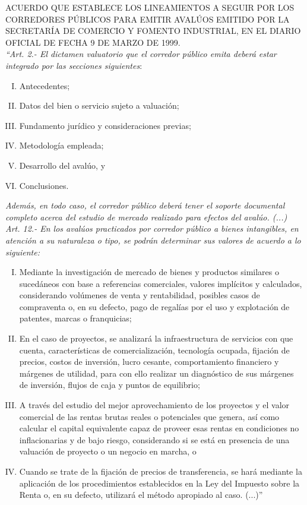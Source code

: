 
\textcolor{principal}{ACUERDO QUE ESTABLECE LOS LINEAMIENTOS A SEGUIR POR LOS CORREDORES P\'UBLICOS PARA EMITIR AVAL\'UOS EMITIDO POR LA SECRETAR\'IA DE COMERCIO Y FOMENTO INDUSTRIAL, EN EL DIARIO OFICIAL DE FECHA 9 DE MARZO DE 1999.}\\[10pt]

\textit{``Art. 2.- El dictamen valuatorio que el corredor p\'ublico emita deber\'a estar integrado por las secciones siguientes}:

\begin{enumerate}[I.]
\item Antecedentes;
\item Datos del bien o servicio sujeto a valuaci\'on;
\item Fundamento jur\'idico y consideraciones previas;
\item Metodolog\'ia empleada;
\item Desarrollo del aval\'uo, y
\item Conclusiones.
\end{enumerate}


\textit{Adem\'as, en todo caso, el corredor p\'ublico deber\'a tener el soporte documental completo acerca del estudio de mercado realizado para efectos del aval\'uo. (...)}\\[10pt]

\textit{Art. 12.- En los aval\'uos practicados por corredor p\'ublico a bienes intangibles, en atenci\'on a su naturaleza o tipo, se podr\'an determinar sus valores de acuerdo a lo siguiente:}

\begin{enumerate}[I.-]
\item Mediante la investigaci\'on de mercado de bienes y productos similares o suced\'aneos con base a referencias comerciales, valores impl\'icitos y calculados, considerando vol\'umenes de venta y rentabilidad, posibles casos de compraventa o, en su defecto, pago de regal\'ias por el uso y explotaci\'on de patentes, marcas o franquicias;


\item En el caso de proyectos, se analizar\'a la infraestructura de servicios con que cuenta, caracter\'isticas de comercializaci\'on, tecnolog\'ia ocupada, fijaci\'on de precios, costos de inversi\'on, lucro cesante, comportamiento financiero y m\'argenes de utilidad, para con ello realizar un diagn\'ostico de sus m\'argenes de inversi\'on, flujos de caja y puntos de equilibrio;

\item A trav\'es del estudio del mejor aprovechamiento de los proyectos y el valor comercial de las rentas brutas reales o potenciales que genera, as\'i como calcular el capital equivalente capaz de proveer esas rentas en condiciones no inflacionarias y de bajo riesgo, considerando si se est\'a en presencia de una valuaci\'on de proyecto o un negocio en marcha, o

\item Cuando se trate de la fijaci\'on de precios de transferencia, se har\'a mediante la aplicaci\'on de los procedimientos establecidos en la Ley del Impuesto sobre la Renta o, en su defecto, utilizar\'a el m\'etodo apropiado al caso. (...)''
\end{enumerate}

